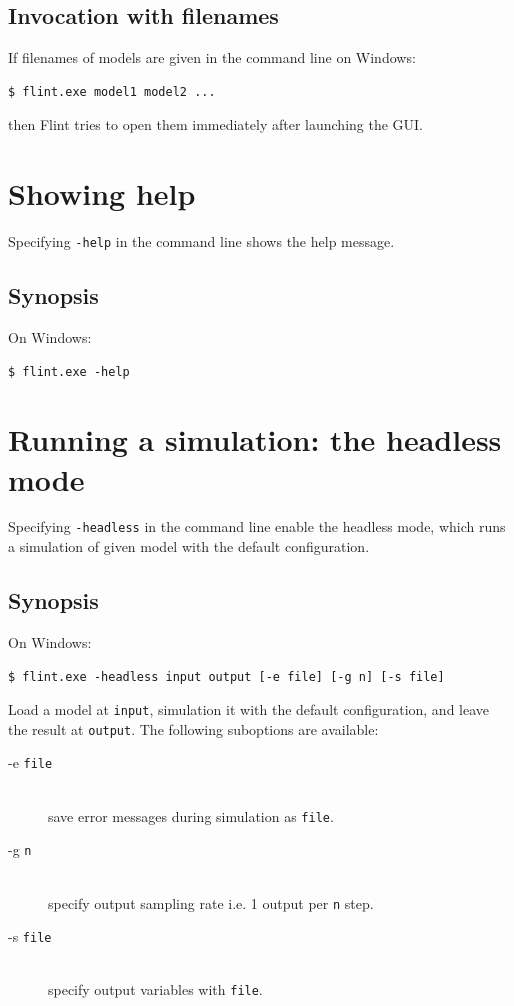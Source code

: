 \documentclass[a4paper,10pt]{report}
\begin{document}
\subsection{Invocation with filenames}
If filenames of models are given in the command line on Windows:
\begin{verbatim}
$ flint.exe model1 model2 ...
\end{verbatim}
then Flint tries to open them immediately after launching the GUI.

\section{Showing help}
Specifying {\tt -help} in the command line shows the help message.

\subsection{Synopsis}
On Windows:
\begin{verbatim}
$ flint.exe -help
\end{verbatim}

\section{Running a simulation: the headless mode}
Specifying {\tt -headless} in the command line enable the headless mode, which
runs a simulation of given model with the default configuration.

\subsection{Synopsis}
On Windows:
\begin{verbatim}
$ flint.exe -headless input output [-e file] [-g n] [-s file]
\end{verbatim}
Load a model at {\tt input}, simulation it with the default configuration,
and leave the result at {\tt output}.
The following suboptions are available:
\begin{description}
\item[-e {\tt file}] \hfill \\
  save error messages during simulation as {\tt file}.
\item[-g {\tt n}] \hfill \\
  specify output sampling rate i.e. 1 output per {\tt n} step.
\item[-s {\tt file}] \hfill \\
  specify output variables with {\tt file}.
\end{description}
\end{document}
